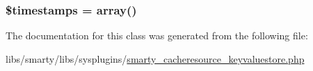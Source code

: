 \subsubsection[{\$timestamps}]{\setlength{\rightskip}{0pt plus 5cm}\$timestamps = array()\hspace{0.3cm}{\ttfamily [protected]}}\label{class_smarty___cache_resource___key_value_store_a51267c24c8fae742ed8f9be0ba6085ee}


The documentation for this class was generated from the following file\+:\begin{DoxyCompactItemize}
\item 
libs/smarty/libs/sysplugins/\hyperlink{smarty__cacheresource__keyvaluestore_8php}{smarty\+\_\+cacheresource\+\_\+keyvaluestore.\+php}\end{DoxyCompactItemize}
